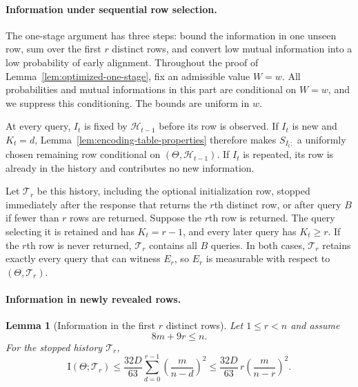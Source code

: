\documentclass{article}
\newtheorem{lemma}[theorem]{Lemma}
\theoremstyle{definition}
\begin{document}
\paragraph{Information under sequential row selection.}
The one-stage argument has three steps: bound the information in one unseen
row, sum over the first $r$ distinct rows, and convert low mutual information
into a low probability of early alignment.
Throughout the proof of Lemma~\ref{lem:optimized-one-stage}, fix an admissible
value $W=w$.  All probabilities and mutual informations in this part are
conditional on $W=w$, and we suppress this conditioning.  The bounds are
uniform in $w$.

At every query, $I_t$ is fixed by $\mathcal H_{t-1}$ before its row is
observed.  If $I_t$ is new and $K_t=d$, Lemma~\ref{lem:encoding-table-properties}
therefore makes $S_{I_t:}$ a uniformly chosen remaining row conditional on
$(\Theta,\mathcal H_{t-1})$.  If $I_t$ is repeated, its row is already in the
history and contributes no new information.

Let $\mathcal T_r$ be this history, including the optional initialization row,
stopped immediately after the response that returns the
$r$th distinct row, or after query $B$ if fewer than $r$ rows are returned.
Suppose the $r$th row is returned.  The query selecting it is retained and has
$K_t=r-1$, and every later query has $K_t\ge r$.  If the $r$th row is never
returned, $\mathcal T_r$ contains all $B$ queries.  In both cases,
$\mathcal T_r$ retains exactly every query that can witness $E_r$, so $E_r$ is
measurable with respect to $(\Theta,\mathcal T_r)$.

\paragraph{Information in newly revealed rows.}
\begin{lemma}[Information in the first $r$ distinct rows]
\label{lem:first-use-row-information}
Let $1\le r<n$ and assume
\begin{equation}
 8m+9r\le n.
 \label{eq:row-information-interior}
\end{equation}
For the stopped history $\mathcal T_r$,
\begin{equation}
 \mathrm I(\Theta;\mathcal T_r)
 \le
 \frac{32D}{63}
 \sum_{d=0}^{r-1}
 \left(\frac{m}{n-d}\right)^2
 \le
 \frac{32D}{63}\,
 r\left(\frac{m}{n-r}\right)^2.
 \label{eq:first-use-row-information}
\end{equation}
\end{lemma}
\end{document}

